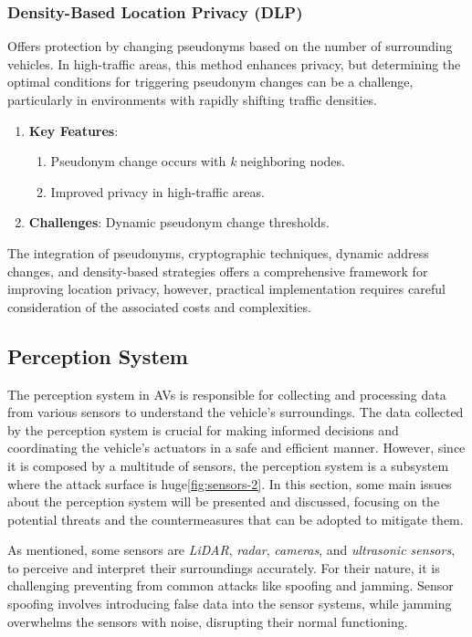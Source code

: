 \subsubsection{Density-Based Location Privacy (DLP)}
Offers protection by changing pseudonyms based on the number of surrounding vehicles.
In high-traffic areas, this method enhances privacy, but determining the optimal conditions for triggering pseudonym changes can be a challenge,
particularly in environments with rapidly shifting traffic densities.
\begin{enumerate}
    \item \textbf{Key Features}:
    \begin{enumerate}
        \item Pseudonym change occurs with \emph{k} neighboring nodes.
        \item Improved privacy in high-traffic areas.
    \end{enumerate}
    \item \textbf{Challenges}: Dynamic pseudonym change thresholds.
\end{enumerate}

The integration of pseudonyms, cryptographic techniques, dynamic address changes, and density-based strategies offers a comprehensive framework
for improving location privacy, however, practical implementation requires careful consideration of the associated costs and complexities\cite{macena2023cybersecurity}.


\subsection{Perception System}\label{subsec:perception-system}

The perception system in AVs is responsible for collecting and processing data from various sensors to understand the vehicle's surroundings.
The data collected by the perception system is crucial for making informed decisions and coordinating the vehicle's actuators in a safe and efficient manner.
However, since it is composed by a multitude of sensors, the perception system is a subsystem where the attack surface is huge\ref{fig:sensors-2}.
In this section, some main issues about the perception system will be presented and discussed, focusing on the potential threats and the countermeasures that can be adopted to mitigate them\cite{sensors}.

As mentioned, some sensors are \textit{LiDAR}, \textit{radar}, \textit{cameras}, and \textit{ultrasonic sensors}, to perceive and interpret their surroundings accurately.
For their nature, it is challenging preventing from common attacks like spoofing and jamming.
Sensor spoofing involves introducing false data into the sensor systems, while jamming overwhelms the sensors with noise, disrupting their normal functioning.

